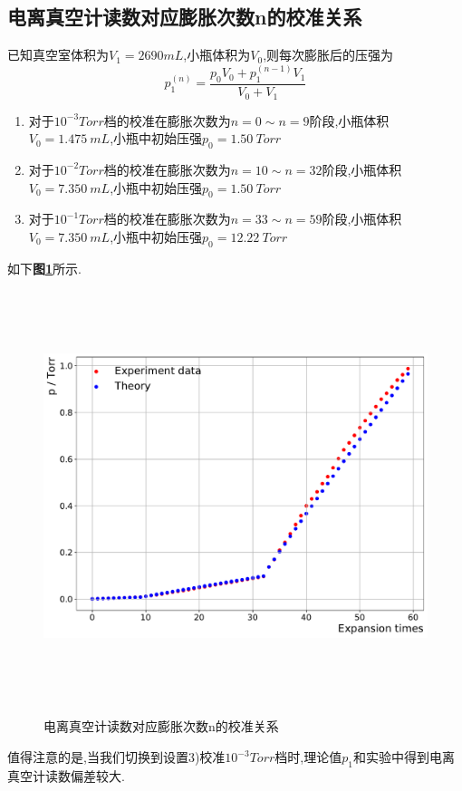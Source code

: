 \documentclass[a4paper]{article}
\begin{document}
\newpage
\subsection{电离真空计读数对应膨胀次数n的校准关系}\label{sub:3}
已知真空室体积为$V_1=2690mL$,小瓶体积为$V_0$,则每次膨胀后的压强为
\begin{equation}
    p_1^{(n)}=\frac{p_0V_0+p^{(n-1)}_1V_1}{V_0+V_1}
\end{equation}
\begin{enumerate}[1)]
    \item 对于$10^{-3}\si{Torr}$档的校准在膨胀次数为$n=0\sim n=9$阶段,小瓶体积$V_0=\SI{1.475}{mL}$,小瓶中初始压强$p_0=\SI{1.50}{Torr}$
    \item 对于$10^{-2}\si{Torr}$档的校准在膨胀次数为$n=10\sim n=32$阶段,小瓶体积$V_0=\SI{7.350}{mL}$,小瓶中初始压强$p_0=\SI{1.50}{Torr}$
    \item 对于$10^{-1}\si{Torr}$档的校准在膨胀次数为$n=33\sim n=59$阶段,小瓶体积$V_0=\SI{7.350}{mL}$,小瓶中初始压强$p_0=\SI{12.22}{Torr}$
\end{enumerate}
如下\textbf{图\ref{fig:fig4}}所示. 
\begin{figure}[H]
 \centering
 \caption{电离真空计读数对应膨胀次数n的校准关系}
 \includegraphics[height=12cm, width=16cm]{images/phyex1_fig2.pdf}
 \label{fig:fig4}
\end{figure}
值得注意的是,当我们切换到设置3)校准$10^{-3}\si{Torr}$档时,理论值$p_1$和实验中得到电离真空计读数偏差较大.
\newpage
\end{document}
